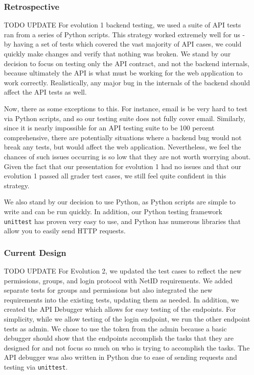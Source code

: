 \documentclass[12pt]{article}
\begin{document}
\subsubsection{Retrospective}
{\huge TODO UPDATE}
For evolution 1 backend testing, we used a suite of API tests ran from a series of Python scripts. This strategy worked extremely well for us - by having a set of tests which covered the vast majority of API cases, we could quickly make changes and verify that nothing was broken. We stand by our decision to focus on testing only the API contract, and not the backend internals, because ultimately the API is what must be working for the web application to work correctly. Realistically, any major bug in the internals of the backend should affect the API tests as well.


Now, there as some exceptions to this. For instance, email is be very hard to test via Python scripts, and so our testing suite does not fully cover email. Similarly, since it is nearly impossible for an API testing suite to be 100 percent comprehensive, there are potentially situations where a backend bug would not break any tests, but would affect the web application. Nevertheless, we feel the chances of such issues occurring is so low that they are not worth worrying about. Given the fact that our presentation for evolution 1 had no issues and that our evolution 1 passed all grader test cases, we still feel quite confident in this strategy. 

We also stand by our decision to use Python, as Python scripts are simple to write and can be run quickly. In addition, our Python testing framework  \texttt{unittest} has proven very easy to use, and Python has numerous libraries that allow you to easily send HTTP requests. 

\subsubsection{Current Design}
{\huge TODO UPDATE}
For Evolution 2, we updated the test cases to reflect the new permissions, groups, and login protocol with NetID requirements. We added separate tests for groups and permissions but also integrated the new requirements into the existing tests, updating them as needed. In addition, we created the API Debugger which allows for easy testing of the endpoints. For simplicity, while we allow testing of the login endpoint, we run the other endpoint tests as admin. We chose to use the token from the admin because a basic debugger should show that the endpoints accomplish the tasks that they are designed for and not focus so much on who is trying to accomplish the tasks. The API debugger was also written in Python due to ease of sending requests and testing via \texttt{unittest}. 
\end{document}
